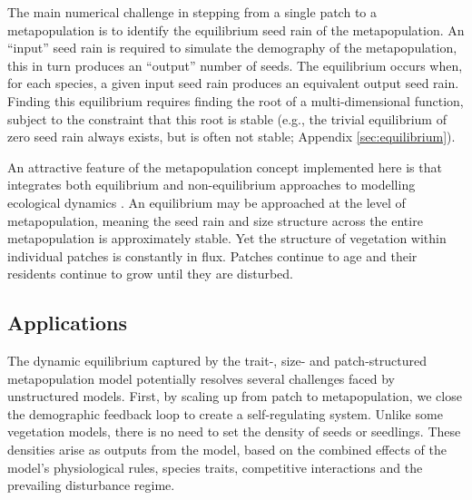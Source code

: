 \documentclass[a4paper,11pt]{article}
\begin{document}
The main numerical challenge in stepping from a single patch to a
metapopulation is to identify the equilibrium seed rain of the
metapopulation. An ``input'' seed rain is required to simulate the
demography of the metapopulation, this in turn produces an ``output''
number of seeds. The equilibrium occurs when, for each species,
a given input seed rain
produces an equivalent output seed rain. Finding this equilibrium
requires finding the root of a multi-dimensional function, subject to
the constraint that this root is stable (e.g., the trivial equilibrium
of zero seed rain always exists, but is often not stable; Appendix
\ref{sec:equilibrium}).

An attractive feature of the metapopulation concept implemented here
is that integrates both equilibrium and non-equilibrium approaches to
modelling ecological dynamics \citep{Kohyama-1993, Moorcroft-2001,
  Falster-2011}. An equilibrium may be approached at the level of
metapopulation, meaning the seed rain and size structure across the
entire metapopulation is approximately stable. Yet the structure of
vegetation within individual patches is constantly in flux. Patches
continue to age and their residents continue to grow until they are
disturbed.

\subsection{Applications}


The dynamic equilibrium captured by the trait-, size- and
patch-structured metapopulation model potentially resolves several
challenges faced by unstructured models. First, by scaling up from
patch to metapopulation, we close the demographic feedback loop to
create a self-regulating system. Unlike some vegetation models, there
is no need to set the density of seeds or seedlings.  These densities
arise as outputs from the model, based on the combined effects of the
model's physiological rules, species traits, competitive interactions
and the prevailing disturbance regime.
\end{document}
